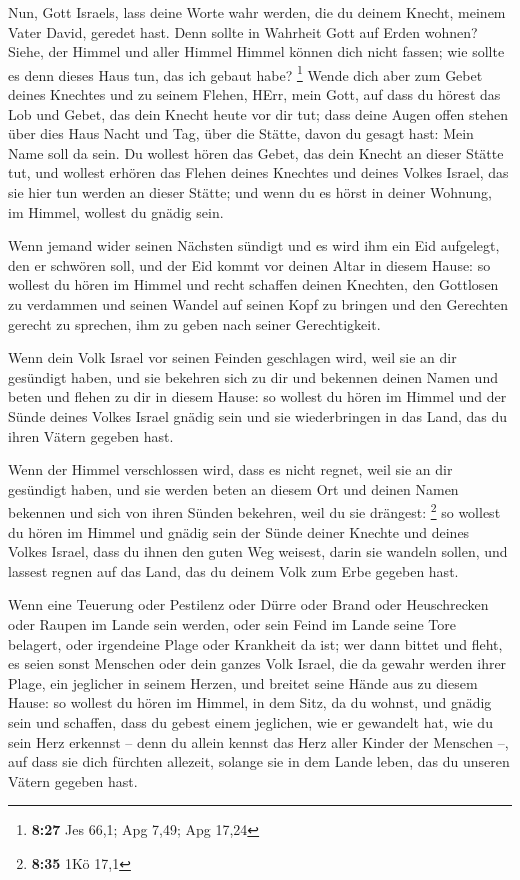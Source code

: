  Nun, Gott Israels, lass deine Worte wahr werden, die du
deinem Knecht, meinem Vater David, geredet hast.  Denn
sollte in Wahrheit Gott auf Erden wohnen? Siehe, der Himmel und aller
Himmel Himmel können dich nicht fassen; wie sollte es denn dieses Haus
tun, das ich gebaut habe? \footnote{\textbf{8:27} Jes 66,1; Apg 7,49;
  Apg 17,24}  Wende dich aber zum Gebet deines Knechtes
und zu seinem Flehen, HErr, mein Gott, auf dass du hörest das Lob und
Gebet, das dein Knecht heute vor dir tut;  dass deine
Augen offen stehen über dies Haus Nacht und Tag, über die Stätte, davon
du gesagt hast: Mein Name soll da sein. Du wollest hören das Gebet, das
dein Knecht an dieser Stätte tut,  und wollest erhören
das Flehen deines Knechtes und deines Volkes Israel, das sie hier tun
werden an dieser Stätte; und wenn du es hörst in deiner Wohnung, im
Himmel, wollest du gnädig sein.

 Wenn jemand wider seinen Nächsten sündigt und es wird
ihm ein Eid aufgelegt, den er schwören soll, und der Eid kommt vor
deinen Altar in diesem Hause:  so wollest du hören im
Himmel und recht schaffen deinen Knechten, den Gottlosen zu verdammen
und seinen Wandel auf seinen Kopf zu bringen und den Gerechten gerecht
zu sprechen, ihm zu geben nach seiner Gerechtigkeit.

 Wenn dein Volk Israel vor seinen Feinden geschlagen
wird, weil sie an dir gesündigt haben, und sie bekehren sich zu dir und
bekennen deinen Namen und beten und flehen zu dir in diesem Hause:
 so wollest du hören im Himmel und der Sünde deines
Volkes Israel gnädig sein und sie wiederbringen in das Land, das du
ihren Vätern gegeben hast.

 Wenn der Himmel verschlossen wird, dass es nicht regnet,
weil sie an dir gesündigt haben, und sie werden beten an diesem Ort und
deinen Namen bekennen und sich von ihren Sünden bekehren, weil du sie
drängest: \footnote{\textbf{8:35} 1Kö 17,1}  so wollest
du hören im Himmel und gnädig sein der Sünde deiner Knechte und deines
Volkes Israel, dass du ihnen den guten Weg weisest, darin sie wandeln
sollen, und lassest regnen auf das Land, das du deinem Volk zum Erbe
gegeben hast.

 Wenn eine Teuerung oder Pestilenz oder Dürre oder Brand
oder Heuschrecken oder Raupen im Lande sein werden, oder sein Feind im
Lande seine Tore belagert, oder irgendeine Plage oder Krankheit da ist;
 wer dann bittet und fleht, es seien sonst Menschen oder
dein ganzes Volk Israel, die da gewahr werden ihrer Plage, ein jeglicher
in seinem Herzen, und breitet seine Hände aus zu diesem Hause:
 so wollest du hören im Himmel, in dem Sitz, da du
wohnst, und gnädig sein und schaffen, dass du gebest einem jeglichen,
wie er gewandelt hat, wie du sein Herz erkennst -- denn du allein kennst
das Herz aller Kinder der Menschen --,  auf dass sie dich
fürchten allezeit, solange sie in dem Lande leben, das du unseren Vätern
gegeben hast.

